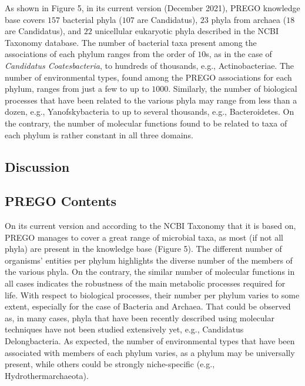{\begin{table}[h]
   \end{table}


   As shown in Figure 5, in its current version (December 2021), PREGO knowledge base covers $157$ bacterial phyla ($107$ are Candidatus), $23$ phyla from archaea ($18$ are Candidatus), and $22$ unicellular eukaryotic phyla described in the NCBI Taxonomy database. 
   The number of bacterial taxa present among the associations of each phylum ranges from the order of $10$s, as in the case of \textit{Candidatus Coatesbacteria}, to hundreds of thousands, e.g., Actinobacteriae. 
   The number of environmental types, found among the PREGO associations for each phylum, ranges from just a few to up to $1000$. 
   Similarly, the number of biological processes that have been related to the various phyla may range from less than a dozen, e.g., Yanofskybacteria to up to several thousands, e.g., Bacteroidetes. On the contrary, the number of molecular functions found to be related to taxa of each phylum is rather constant in all three domains.




\subsection{Discussion}
\label{sec:prego-discussion}

   \subsection*{PREGO Contents}
   \label{subsec:prego-contents-disc}

   On its current version and according to the NCBI Taxonomy that it is based on, PREGO manages to cover a great range of microbial taxa, as most (if not all phyla) are present in the knowledge base (Figure 5). The different number of organisms’ entities per phylum highlights the diverse number of the members of the various phyla. On the contrary, the similar number of molecular functions in all cases indicates the robustness of the main metabolic processes required for life. With respect to biological processes, their number per phylum varies to some extent, especially for the case of Bacteria and Archaea. That could be observed as, in many cases, phyla that have been recently described using molecular techniques have not been studied extensively yet, e.g., Candidatus Delongbacteria. As expected, the number of environmental types that have been associated with members of each phylum varies, as a phylum may be universally present, while others could be strongly niche-specific (e.g., Hydrothermarchaeota).

}
